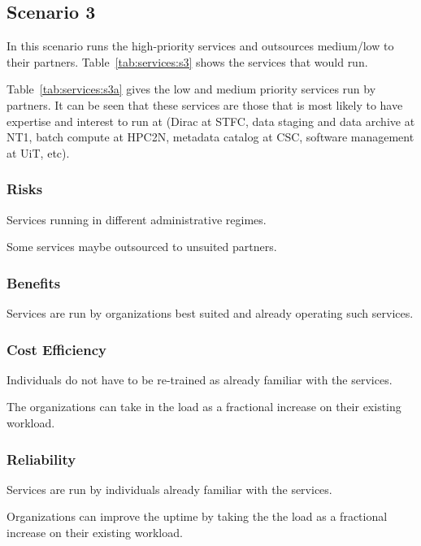 \documentclass[12pt,a4paper]{article}
\begin{document}

\subsection{Scenario 3}
\label{ssec:scen3}

In this scenario \EC runs the high-priority services and outsources medium/low to their partners.
Table~\ref{tab:services:s3} shows the services that \EC would run.

Table~\ref{tab:services:s3a} gives the low and medium priority services run by \EC partners.
It can be seen that these services are those that \EC is most likely to have expertise and interest to run at 
(Dirac at STFC, data staging and data archive at NT1, batch compute at HPC2N, metadata catalog at CSC, software management at UiT, etc).




\subsubsection*{Risks}
\bitm
  \item Services running in different administrative regimes.
  \item Some services maybe outsourced to unsuited partners.
\eitm

\subsubsection*{Benefits}
\bitm
\item Services are run by organizations best suited and already operating such services.
\eitm

\subsubsection*{Cost Efficiency}
\bitm
\item Individuals do not have to be re-trained as already familiar with the services.
\item The organizations can take in the \ED load as a fractional increase on their existing workload.
\eitm

\subsubsection*{Reliability}
\bitm
\item Services are run by individuals already familiar with the services.
\item Organizations can improve the uptime by taking the the \ED load as a fractional increase on their existing workload.
\eitm
\end{document}
